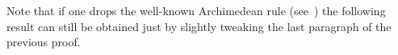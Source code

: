 \documentclass[a4paper,UKenglish,cleveref, autoref, thm-restate]{lipics-v2021}
\begin{document}
%
Note that if one drops the well-known Archimedean rule
(see~\cite{dahlqvist22,dahlqvist2023syntactic,mardare2016quantitative}) the
following result can still be obtained just by slightly tweaking the last
paragraph of the previous proof.
\end{document}
